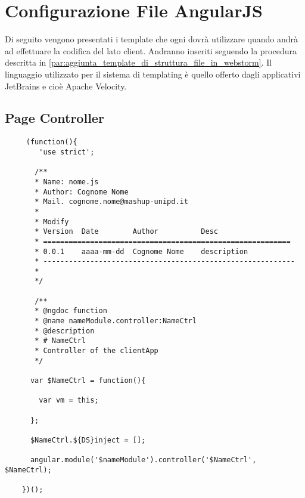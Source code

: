 %



\section{Configurazione File AngularJS} %
\label{sec:configurazione_file_angularjs}
Di seguito vengono presentati i template che ogni \roleProgrammer{} dovrà utilizzare quando andrà ad effettuare la codifica del lato client. Andranno inseriti seguendo la procedura descritta in \ref{par:aggiunta_template_di_struttura_file_in_webstorm}. Il linguaggio utilizzato per il sistema di templating è quello offerto dagli applicativi JetBrains e cioè Apache Velocity. \newline

	\subsection{Page Controller} %
	\label{sub:page_controller}
	\begin{verbatim}
	 (function(){
	    'use strict';

	   /**
	   * Name: nome.js
	   * Author: Cognome Nome
	   * Mail. cognome.nome@mashup-unipd.it
	   *
	   * Modify
	   * Version  Date        Author          Desc
	   * ==========================================================
	   * 0.0.1    aaaa-mm-dd  Cognome Nome    description
	   * -----------------------------------------------------------
	   *
	   */

	   /**
	   * @ngdoc function
	   * @name nameModule.controller:NameCtrl
	   * @description
	   * # NameCtrl
	   * Controller of the clientApp
	   */

	  var $NameCtrl = function(){

	    var vm = this;

	  };

	  $NameCtrl.${DS}inject = [];

	  angular.module('$nameModule').controller('$NameCtrl', $NameCtrl);

	})();
	\end{verbatim}


